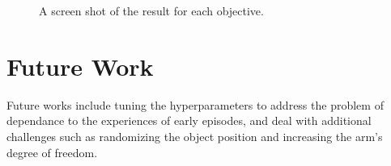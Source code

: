 \documentclass[a4paper]{article}
\begin{document}
\begin{figure}[htp]
  \centering
  \vfill
  \caption{A screen shot of the result for each objective.}
\end{figure}

\section{Future Work}
Future works include tuning the hyperparameters to address the problem of dependance to the experiences of early episodes, and deal with additional challenges such as randomizing the object position and increasing the arm's degree of freedom.



\end{document}
